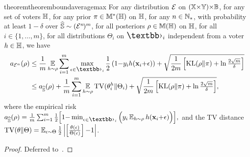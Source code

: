 \begin{restatable}{theorem}{theoremboundaveragemax}\label{chap:mv-robustness:theorem:bound-average-max}
For any distribution ${\mathcal{E}}$ on $(\mathbb{X}{\times}\mathbb{Y}){\times}\mathbb{B}$, for any set of voters $\mathbb{H}$, for any prior  $\pi\in\mathbb{M}^*(\mathbb{H})$ on $\mathbb{H}$, for any $n\in\mathbb{N}_{*}$,  with probability at least $1{-}\delta$ over $\widehat{\mathbb{S}}\sim({\mathcal{E}}^{n\!})^m$, for all posteriors  $\rho\in\mathbb{M}(\mathbb{H})$ on $\mathbb{H}$, for all $i\in\{1,\dots,m\}$, for all distributions $\Theta_i$ on $\Epert_i$ independent from a voter $h\in\mathbb{H}$, we have
\begin{align}
    \RiskMS_{\Dpert^{n}}(\Q) &\le \frac{1}{\m}\EE_{\h\sim\Q}\sum_{i=1}^{\m}\max_{\epsilon\in\Epert_i}\frac{1}{2}\LP1{-}\y_i\h(\x_i{+}\epsilon)\RP + \sqrt{\frac{1}{2\m} \LB\KL(\Q\|\P)+\ln\tfrac{2\sqrt{\m}}{\delta}\RB}\label{chap:mv-robustness:eq:max-mcallester-0}\\
    &\le \RiskMS_{\Spert}(\Q)+ \frac{1}{\m}\sum_{i=1}^{\m}\EE_{\h\sim\Q}\TV(\theta_i^{\h}\|\Theta_i)
    + \sqrt{ \frac{1}{2\m} \LB\KL(\Q\|\P)+\ln\tfrac{2\sqrt{\m}}{\delta}\RB},\label{chap:mv-robustness:eq:max-mcallester} 
\end{align}
where the empirical risk $\RiskMS_{\Spert}(\Q) =  \frac{1}{\m}\sum_{i=1}^{\m}\frac{1}{2}\Big[1{-}\min_{\epsilon{\in}\Epert_i}\Big( \y_i\EE_{\h{\sim}\Q}\h(\x_{i}{+}\epsilon)\Big)\Big],$
 and the TV distance ${\rm TV}(\theta\|\Theta) = \operatorname*{\mathbb{E}}_{\epsilon\sim\Theta}\frac{1}{2}\left|\left[\frac{\theta(\epsilon)}{\Theta(\epsilon)}\right]{-}1\right|$.
\end{restatable}
\begin{noaddcontents}\begin{proof}
Deferred to~.
\end{proof}\end{noaddcontents}

